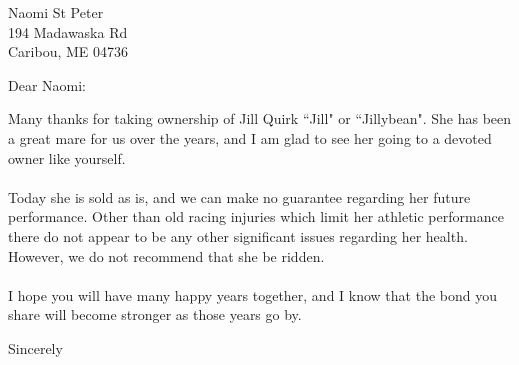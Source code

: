 \documentclass[a4paper,12pt]{letter}
\begin{document}
\begin{letter}{Naomi St Peter\\194 Madawaska Rd\\Caribou, ME 04736}
\opening{Dear Naomi:} %
Many thanks for taking ownership of Jill Quirk ``Jill" or ``Jillybean". She has been a great mare for us over the years, and I am glad to see her going to a devoted owner like yourself. \\~\\
Today she is sold as is, and we can make no guarantee regarding her future performance. Other than old racing injuries which limit her athletic performance there do not appear to be any other significant issues regarding her health. However, we do not recommend that she be ridden.\\~\\
I hope  you will have many happy years together, and I know that the bond you share will become stronger as those years go by.
\closing{Sincerely} %
\end{letter}
\end{document}
